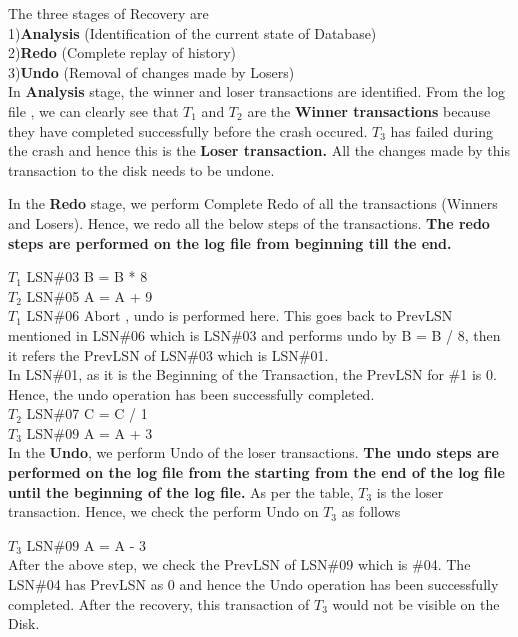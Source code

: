   The three stages of Recovery are \\1)\textbf{Analysis} (Identification of the current state of Database)\\ 2)\textbf{Redo} (Complete replay of history)\\ 3)\textbf{Undo} (Removal of changes made by Losers)\\


  In \textbf{Analysis} stage, the winner and loser transactions are identified. 
  From the log file ,  we can clearly see that $T_1$ and $T_2$ are the \textbf{Winner transactions} because they have completed successfully before the crash occured.
  $T_3$ has failed during the crash and hence this is the \textbf{Loser transaction.} All the changes made by this transaction to the disk needs to be undone.


  In the \textbf{{Redo}} stage, we perform Complete Redo of all the transactions (Winners and Losers). Hence, we redo all the below steps of the transactions. 
  \textbf{The redo steps are performed on the log file from beginning till the end.}

  $T_1$ LSN\#03 B = B * 8\\
  $T_2$ LSN\#05 A = A + 9\\
  $T_1$ LSN\#06 Abort , undo is performed here. This goes back to PrevLSN mentioned in LSN\#06 which is LSN\#03 and performs undo by B = B / 8, then it refers the PrevLSN of LSN\#03 which is LSN\#01.\\ 
  In LSN\#01, as it is the Beginning of the Transaction, the PrevLSN for \#1 is 0. Hence, the undo operation has been successfully completed.\\
  $T_2$ LSN\#07 C = C / 1\\
  $T_3$ LSN\#09 A = A + 3\\

  In the \textbf{Undo}, we perform Undo of the loser transactions. \textbf{The undo steps are performed on the log file from the starting from the end of the log file until the beginning of the log file.} 
  As per the table, $T_3$ is the loser transaction. Hence, we check the perform Undo on $T_3$ as follows

  $T_3$ LSN\#09 A = A - 3\\
  
  After the above step, we check the PrevLSN of LSN\#09 which is \#04. The  LSN\#04 has PrevLSN as 0 and hence the Undo operation has been successfully completed. 
  After the recovery, this transaction of $T_3$ would not be visible on the Disk.

